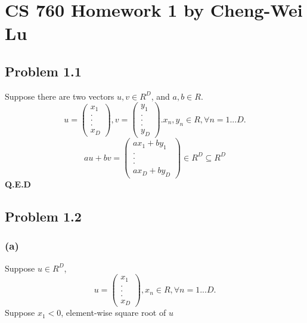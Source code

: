 \documentclass{article}
\begin{document}
\section*{CS 760 Homework 1 by Cheng-Wei Lu}

\subsection*{Problem 1.1}
	Suppose there are two vectors $u,v \in R^D$, and $a,b \in R$.
	\begin{equation*}
		u= \begin{pmatrix} x_1 \\ . \\ . \\ . \\ x_D \end{pmatrix},  v= \begin{pmatrix} y_1 \\ . \\ . \\ . \\ y_D \end{pmatrix}.     x_n, y_n \in R, \forall n = 1 ... D. 
	\end{equation*}
	\begin{equation*}
		au + bv =  \begin{pmatrix} ax_1 + by_1\\ . \\ . \\ . \\ ax_D+by_D \end{pmatrix} \in R^D \subseteq R^D 
	\end{equation*}
	\textbf{Q.E.D}

\subsection*{Problem 1.2}
    \subsubsection*{(a)}	
    	Suppose $u \in R^D$,
    	 \begin{equation*}
    		u= \begin{pmatrix} x_1 \\ . \\ . \\ . \\ x_D \end{pmatrix}, x_n \in R, \forall n = 1 ... D. 
    	\end{equation*}
    	Suppose $x_1 <  0$, element-wise square root of $u$
    	
\end{document}
